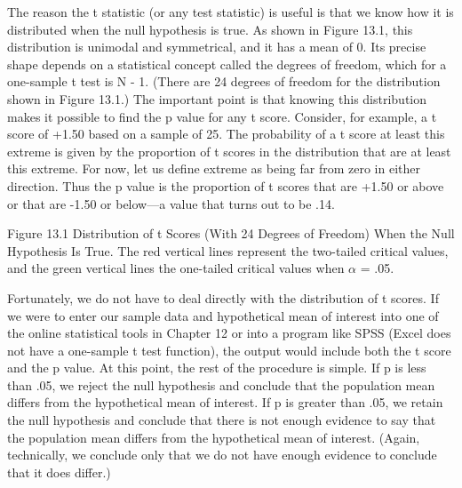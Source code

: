 The reason the t statistic (or any test statistic) is useful is that we know how it is distributed when the null hypothesis is true. As shown in Figure 13.1, this distribution is unimodal and symmetrical, and it has a mean of 0. Its precise shape depends on a statistical concept called the degrees of freedom, which for a one-sample t test is N - 1. (There are 24 degrees of freedom for the distribution shown in Figure 13.1.) The important point is that knowing this distribution makes it possible to find the p value for any t score. Consider, for example, a t score of +1.50 based on a sample of 25. The probability of a t score at least this extreme is given by the proportion of t scores in the distribution that are at least this extreme. For now, let us define extreme as being far from zero in either direction. Thus the p value is the proportion of t scores that are +1.50 or above or that are -1.50 or below---a value that turns out to be .14.


Figure 13.1 Distribution of t Scores (With 24 Degrees of Freedom) When the Null Hypothesis Is True. The red vertical lines represent the two-tailed critical values, and the green vertical lines the one-tailed critical values when $\alpha$ = .05.


Fortunately, we do not have to deal directly with the distribution of t scores. If we were to enter our sample data and hypothetical mean of interest into one of the online statistical tools in Chapter 12 or into a program like SPSS (Excel does not have a one-sample t test function), the output would include both the t score and the p value. At this point, the rest of the procedure is simple. If p is less than .05, we reject the null hypothesis and conclude that the population mean differs from the hypothetical mean of interest. If p is greater than .05, we retain the null hypothesis and conclude that there is not enough evidence to say that the population mean differs from the hypothetical mean of interest. (Again, technically, we conclude only that we do not have enough evidence to conclude that it does differ.)



